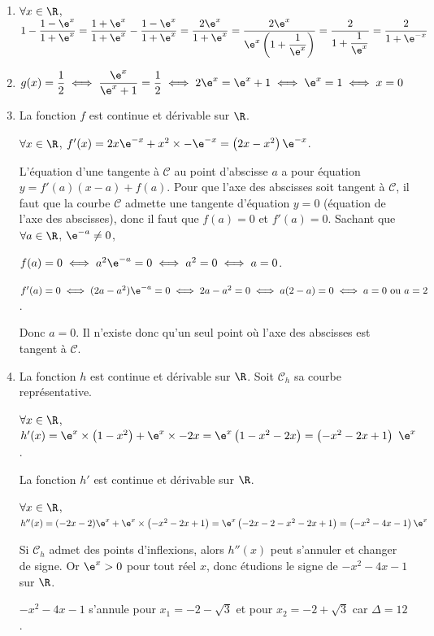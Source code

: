\bigskip
\begin{enumerate}
	\item $\forall x \in \R$, $1-\dfrac{1-\e^x}{1+\e^{x}}=\dfrac{1+\e^x}{1+\e^x}-\dfrac{1-\e^x}{1+\e^x}=\dfrac{2\e^x}{1+\e^x}=\dfrac{2\e^x}{\e^x\left(1+\dfrac{1}{\e^x}\right)}=\dfrac{2}{1+\dfrac{1}{\e^x}}=\dfrac{2}{1+\e^{-x}}$

\hfill {}
\item $g(x)=\dfrac12 \iff \dfrac{\e^x}{\e^x+1}=\dfrac12 \iff 2\e^x=\e^x+1 \iff \e^x=1 \iff x=0$
\hfill {}
	\item La fonction $f$ est continue et dérivable sur $\R$.

	$\forall x \in \R$, $f'(x)=2x\e^{-x}+x^2\times -\e^{-x}= \left(2x-x^2\right)\e^{-x}$.

	L'équation d'une tangente à $\mathcal{C}$ au point d'abscisse $a$ a pour équation $ y=f'(a)(x-a)+f(a)$. Pour que l'axe des abscisses soit tangent à $\mathcal{C}$, il faut que la courbe $\mathcal{C}$ admette une tangente d'équation $y=0$ (équation de l'axe des abscisses), donc il faut que $f(a)=0$ et $f'(a)=0$. Sachant que $\forall a \in \R$, $\e^{-a}\neq 0$,

$f(a)=0 \iff a^2\e^{-a}=0 \iff a^2=0 \iff a=0$. 

$f'(a)=0\iff (2a-a^2)\e^{-a}=0 \iff 2a-a^2=0 \iff a(2-a)=0 \iff a=0 \text{ ou } a=2$.
	
Donc $a=0$. Il n'existe donc qu'un seul point où l'axe des abscisses est tangent à $\mathcal{C}$.

\hfill {}
	\item La fonction $h$ est continue et dérivable sur $\R$. Soit $\mathcal{C}_h$ sa courbe représentative.

$\forall x \in \R$, $h'(x)=\e^x\times \left(1-x^2\right)+\e^x\times-2x=\e^x\left(1-x^2-2x\right)= \left(-x^2-2x+1\right)~\e^x$.

La fonction $h'$ est continue et dérivable sur $\R$.

$\forall x \in \R$, $h''(x)=(-2x-2)\e^x+\e^x\times\left(-x^2-2x+1\right) =\e^x\left(-2x-2-x^2-2x+1\right)= \left(-x^2-4x-1\right)\e^x$

Si $\mathcal{C}_h$ admet des points d'inflexions, alors $h''(x)$ peut s'annuler et changer de signe. Or $\e^x > 0$ pour tout réel $x$, donc étudions le signe de $- x^2- 4x- 1$ sur $\R$.

$-x^2-4x-1$ s'annule pour $x_1=-2-\sqrt{3}$ et pour $x_2=-2+\sqrt{3}$ car $\Delta = 12$.


\end{enumerate}
